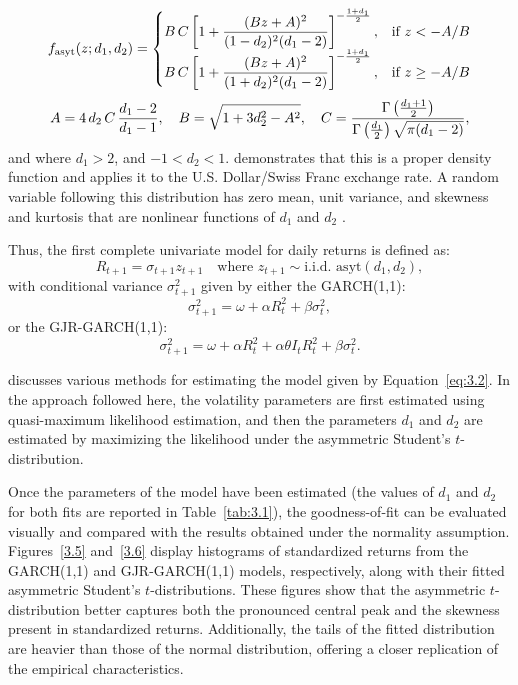 \begin{equation}
f_{\text{asyt}}(z; d_1, d_2) =
\begin{cases}
B \thinspace C \left[ 1 + \dfrac{(Bz + A)^2}{(1 - d_2)^2 (d_1 - 2)} \right]^{-\frac{1 + d_1}{2}}, & \text{if } z < -A/B \\
B \thinspace C \left[ 1 + \dfrac{(Bz + A)^2}{(1 + d_2)^2 (d_1 - 2)} \right]^{-\frac{1 + d_1}{2}}, & \text{if } z \geq -A/B
\end{cases}
\label{eq:3.1}
\end{equation}
\noindent{}
\[
A = 4\thinspace d_2\thinspace C  \thinspace  \dfrac{d_1 - 2}{d_1 - 1}, \quad
B = \sqrt{1 + 3d_2^2 - A^2}, \quad
C = \dfrac{\Gamma\left( \frac{d_1 + 1}{2} \right)}{\Gamma\left( \frac{d_1}{2} \right) \sqrt{\pi (d_1 - 2)}},
\]
and where $d_{1} > 2$, and $-1 < d_{2} < 1$.  demonstrates that this is a proper density function and applies it to the U.S. Dollar/Swiss Franc exchange rate. A random variable following this distribution has zero mean, unit variance, and skewness and kurtosis that are nonlinear functions of $d_1$ and $d_2$ \cite{Christoffersen2012}. 

Thus, the first complete univariate model for daily returns is defined as:
\begin{equation}
    R_{t+1}=\sigma_{t+1}z_{t+1} \quad \text{where } z_{t+1} \sim \text{i.i.d. asyt}(d_1,d_2),
    \label{eq:3.2}
\end{equation}
with conditional variance $\sigma^2_{t+1}$ given by either the GARCH(1,1):
\begin{equation}
   \sigma^2_{t+1} = \omega + \alpha R^2_t + \beta \sigma^2_t,
    \label{eq:3.3}
\end{equation}
or the GJR-GARCH(1,1):
\begin{equation}
  \sigma^2_{t+1} = \omega + \alpha R^2_t + \alpha \theta I_t R^2_t + \beta \sigma^2_t.
    \label{eq:3.4}
\end{equation}

 discusses various methods for estimating the model given by Equation~\eqref{eq:3.2}. In the approach followed here, the volatility parameters are first estimated using quasi-maximum likelihood estimation, and then the parameters $d_1$ and $d_2$ are estimated by maximizing the likelihood under the asymmetric Student’s $t$-distribution.

Once the parameters of the model have been estimated (the values of $d_1$ and $d_2$ for both fits are reported in Table~\ref{tab:3.1}), the goodness-of-fit can be evaluated visually and compared with the results obtained under the normality assumption. Figures~\ref{3.5} and~\ref{3.6} display histograms of standardized returns from the GARCH(1,1) and GJR-GARCH(1,1) models, respectively, along with their fitted asymmetric Student’s $t$-distributions. These figures show that the asymmetric $t$-distribution better captures both the pronounced central peak and the skewness present in standardized returns. Additionally, the tails of the fitted distribution are heavier than those of the normal distribution, offering a closer replication of the empirical characteristics.

